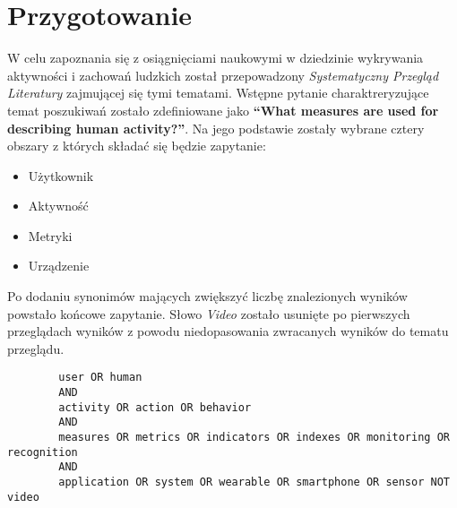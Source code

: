 \section{Przygotowanie}
W celu zapoznania się z osiągnięciami naukowymi w dziedzinie wykrywania aktywności i zachowań ludzkich został przepowadzony \textit{Systematyczny Przegląd Literatury} zajmującej się tymi tematami. Wstępne pytanie charaktreryzujące temat poszukiwań zostało zdefiniowane jako \textbf{``What measures are used for describing human activity?''}. Na jego podstawie zostały wybrane cztery obszary z których składać się będzie zapytanie:
\begin{itemize}
    \item Użytkownik
    \item Aktywność
    \item Metryki
    \item Urządzenie
\end{itemize}

Po dodaniu synonimów mających zwiększyć liczbę znalezionych wyników powstało końcowe zapytanie. Słowo \textit{Video} zostało usunięte po pierwszych przeglądach wyników z powodu niedopasowania zwracanych wyników do tematu przeglądu.
\begin{center}
	\begin{minipage}{0.85\linewidth}
		\begin{verbatim}
		user OR human
		AND
		activity OR action OR behavior
		AND
		measures OR metrics OR indicators OR indexes OR monitoring OR recognition
		AND
		application OR system OR wearable OR smartphone OR sensor NOT video
		\end{verbatim}
	\end{minipage}
\end{center}
